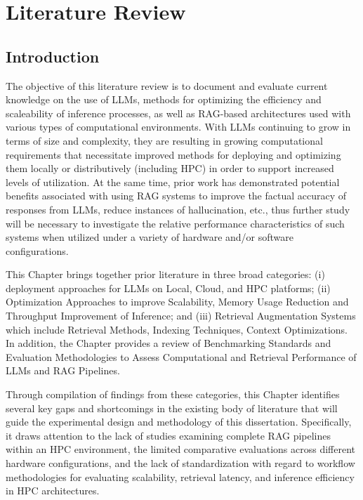 \chapter{Literature Review}

\section{Introduction}

The objective of this literature review is to document and evaluate current knowledge on the use of \acp{LLM}, methods for optimizing the efficiency and scaleability of inference processes, as well as \ac{RAG}-based architectures used with various types of computational environments. With \acp{LLM} continuing to grow in terms of size and complexity, they are resulting in growing computational requirements that necessitate improved methods for deploying and optimizing them locally or distributively (including \ac{HPC}) in order to support increased levels of utilization. At the same time, prior work has demonstrated potential benefits associated with using RAG systems to improve the factual accuracy of responses from \acp{LLM}, reduce instances of hallucination, etc., thus further study will be necessary to investigate the relative performance characteristics of such systems when utilized under a variety of hardware and/or software configurations.

This Chapter brings together prior literature in three broad categories: (i) deployment approaches for \acp{LLM} on Local, Cloud, and \ac{HPC} platforms; (ii) Optimization Approaches to improve Scalability, Memory Usage Reduction and Throughput Improvement of Inference; and (iii) Retrieval Augmentation Systems which include Retrieval Methods, Indexing Techniques, Context Optimizations. In addition, the Chapter provides a review of Benchmarking Standards and Evaluation Methodologies to Assess Computational and Retrieval Performance of \acp{LLM} and \ac{RAG} Pipelines.

Through compilation of findings from these categories, this Chapter identifies several key gaps and shortcomings in the existing body of literature that will guide the experimental design and methodology of this dissertation. Specifically, it draws attention to the lack of studies examining complete \ac{RAG} pipelines within an \ac{HPC} environment, the limited comparative evaluations across different hardware configurations, and the lack of standardization with regard to workflow methodologies for evaluating scalability, retrieval latency, and inference efficiency in \ac{HPC} architectures.

